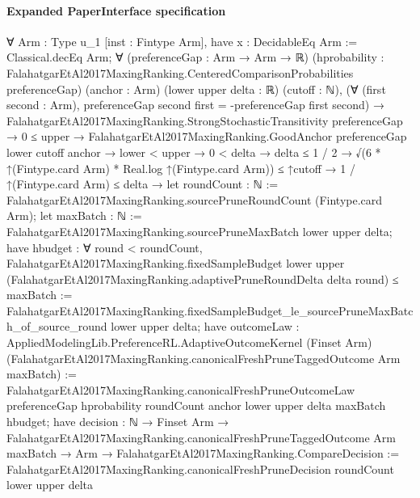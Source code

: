 \documentclass[10pt]{article}
\begin{document}
\paragraph{Expanded PaperInterface specification}
\begin{ReviewVerbatim}
∀ {Arm : Type u_1} [inst : Fintype Arm],
  have x : DecidableEq Arm := Classical.decEq Arm;
  ∀ (preferenceGap : Arm → Arm → ℝ)
    (hprobability : FalahatgarEtAl2017MaxingRanking.CenteredComparisonProbabilities preferenceGap) (anchor : Arm)
    (lower upper delta : ℝ) (cutoff : ℕ),
    (∀ (first second : Arm), preferenceGap second first = -preferenceGap first second) →
      FalahatgarEtAl2017MaxingRanking.StrongStochasticTransitivity preferenceGap →
        0 ≤ upper →
          FalahatgarEtAl2017MaxingRanking.GoodAnchor preferenceGap lower cutoff anchor →
            lower < upper →
              0 < delta →
                delta ≤ 1 / 2 →
                  √(6 * ↑(Fintype.card Arm) * Real.log ↑(Fintype.card Arm)) ≤ ↑cutoff →
                    1 / ↑(Fintype.card Arm) ≤ delta →
                      let roundCount : ℕ := FalahatgarEtAl2017MaxingRanking.sourcePruneRoundCount (Fintype.card Arm);
                      let maxBatch : ℕ := FalahatgarEtAl2017MaxingRanking.sourcePruneMaxBatch lower upper delta;
                      have hbudget :
                        ∀ round < roundCount,
                          FalahatgarEtAl2017MaxingRanking.fixedSampleBudget lower upper
                              (FalahatgarEtAl2017MaxingRanking.adaptivePruneRoundDelta delta round) ≤
                            maxBatch :=
                        FalahatgarEtAl2017MaxingRanking.fixedSampleBudget_le_sourcePruneMaxBatch_of_source_round lower
                          upper delta;
                      have outcomeLaw :
                        AppliedModelingLib.PreferenceRL.AdaptiveOutcomeKernel (Finset Arm)
                          (FalahatgarEtAl2017MaxingRanking.canonicalFreshPruneTaggedOutcome Arm maxBatch) :=
                        FalahatgarEtAl2017MaxingRanking.canonicalFreshPruneOutcomeLaw preferenceGap hprobability
                          roundCount anchor lower upper delta maxBatch hbudget;
                      have decision :
                        ℕ →
                          Finset Arm →
                            FalahatgarEtAl2017MaxingRanking.canonicalFreshPruneTaggedOutcome Arm maxBatch →
                              Arm → FalahatgarEtAl2017MaxingRanking.CompareDecision :=
                        FalahatgarEtAl2017MaxingRanking.canonicalFreshPruneDecision roundCount lower upper delta

\end{ReviewVerbatim}
\end{document}
